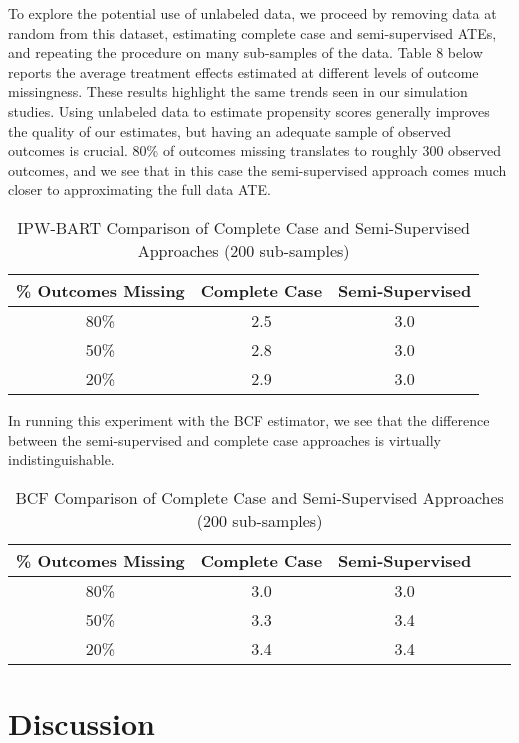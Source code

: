 \documentclass[aos]{imsart}
\begin{document}
To explore the potential use of unlabeled data, we proceed by removing data at random from this dataset, estimating complete case and semi-supervised ATEs, and repeating the procedure 
on many sub-samples of the data. Table 8 below reports the average treatment effects estimated at different levels of outcome missingness.
These results highlight the same trends seen in our simulation studies. Using unlabeled data to estimate propensity scores generally improves the quality of our estimates, but having an 
adequate sample of observed outcomes is crucial. 80\% of outcomes missing translates to roughly 300 observed outcomes, and we see that in this case the semi-supervised approach comes 
much closer to approximating the full data ATE.

\begin{table}[ht]
\centering
\begingroup\small
\begin{tabular}{ccc}
  \hline
\% Outcomes Missing & Complete Case & Semi-Supervised \\ 
  \hline
80\% & 2.5 & 3.0 \\ 
50\% & 2.8 & 3.0 \\ 
20\% & 2.9 & 3.0 \\ 
   \hline
\end{tabular}
\endgroup
\caption{IPW-BART Comparison of Complete Case and Semi-Supervised Approaches (200 sub-samples)} 
\end{table}

In running this experiment with the BCF estimator, we see that the difference between the semi-supervised and complete case approaches is virtually indistinguishable. 

\begin{table}[ht]
\centering
\begingroup\small
\begin{tabular}{ccccc}
  \hline
\% Outcomes Missing & Complete Case & Semi-Supervised \\ 
  \hline
80\% & 3.0 & 3.0 \\ 
50\% & 3.3 & 3.4 \\ 
20\% & 3.4 & 3.4 \\ 
   \hline
\end{tabular}
\endgroup
\caption{BCF Comparison of Complete Case and Semi-Supervised Approaches (200 sub-samples)} 
\end{table}

\section{Discussion}
\end{document}
